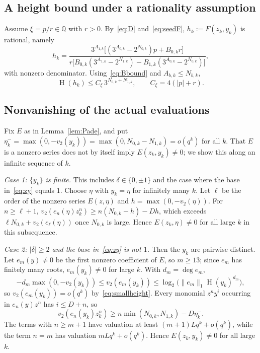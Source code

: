 \documentclass[11pt]{amsart}
\theoremstyle{remark}
\theoremstyle{definition}
\numberwithin{equation}{section}
\newcommand{\Q}{\mathbb{Q}}
\newcommand{\Ht}{\operatorname{H}}
\newcommand{\vt}{v_2}
\begin{document}
\subsection{A height bound under a rationality assumption}
Assume $\xi=p/r\in\Q$ with $r>0$. By~\eqref{eq:D} and~\eqref{eq:seedF}, $h_k:=F(z_k,y_k)$ is rational, namely
\[
h_k=\frac{3^{A_{1,k}}\bigl[(3^{A_{0,k}}-2^{N_{0,k}})p+B_{0,k}r\bigr]}{r\bigl[B_{0,k}(3^{A_{1,k}}-2^{N_{1,k}})-B_{1,k}(3^{A_{0,k}}-2^{N_{0,k}})\bigr]},
\]
with nonzero denominator. Using~\eqref{eq:Bbound} and $A_{b,k}\le N_{b,k}$,
\begin{equation}\label{eq:hheight}
\Ht(h_k)\le C_\xi\,3^{N_{0,k}+N_{1,k}},\qquad C_\xi=4(|p|+r).
\end{equation}

\subsection{Nonvanishing of the actual evaluations}
Fix $E$ as in Lemma~\ref{lem:Pade}, and put $\eta_k^-=\max(0,-\vt(y_k))=\max(0,N_{0,k}-N_{1,k})=o(q^k)$ for all $k$. That $E$ is a nonzero series does not by itself imply $E(z_k,y_k)\ne0$; we show this along an infinite sequence of $k$.

\emph{Case 1: $\{y_k\}$ is finite.} This includes $\delta\in\{0,\pm1\}$ and the case where the base in~\eqref{eq:zy} equals $1$. Choose $\eta$ with $y_k=\eta$ for infinitely many $k$. Let $\ell$ be the order of the nonzero series $E(z,\eta)$ and $h=\max(0,-\vt(\eta))$. For $n\ge\ell+1$, $\vt(e_n(\eta)z_k^n)\ge n(N_{0,k}-h)-Dh$, which exceeds $\ell N_{0,k}+\vt(e_\ell(\eta))$ once $N_{0,k}$ is large. Hence $E(z_k,\eta)\ne0$ for all large $k$ in this subsequence.

\emph{Case 2: $|\delta|\ge2$ and the base in~\eqref{eq:zy} is not $1$.} Then the $y_k$ are pairwise distinct. Let $e_m(y)\ne0$ be the first nonzero coefficient of $E$, so $m\ge13$; since $e_m$ has finitely many roots, $e_m(y_k)\ne0$ for large $k$. With $d_m=\deg e_m$,
\[
-d_m\max(0,-\vt(y_k))\le\vt(e_m(y_k))\le\log_2\bigl(\|e_m\|_1\Ht(y_k)^{d_m}\bigr),
\]
so $\vt(e_m(y_k))=o(q^k)$ by~\eqref{eq:smallheight}. Every monomial $z^ny^i$ occurring in $e_n(y)z^n$ has $i\le D+n$, so
\begin{equation}\label{eq:tail}
\vt(e_n(y_k)z_k^n)\ge n\min(N_{0,k},N_{1,k})-D\eta_k^- .
\end{equation}
The terms with $n\ge m+1$ have valuation at least $(m+1)Lq^k+o(q^k)$, while the term $n=m$ has valuation $mLq^k+o(q^k)$. Hence $E(z_k,y_k)\ne0$ for all large $k$.
\end{document}
